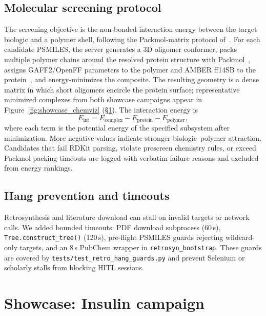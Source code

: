 \documentclass[twocolumn]{fairmeta}
\begin{document}
\subsection{Molecular screening protocol}
\label{sec:screening}

The screening objective is the non-bonded interaction energy between the target biologic and a polymer shell, following the Packmol-matrix protocol of~\cite{martins2026insulin}.
For each candidate PSMILES, the server generates a 3D oligomer conformer, packs multiple polymer chains around the resolved protein structure with Packmol~\cite{packmol2009}, assigns GAFF2/OpenFF parameters to the polymer and AMBER ff14SB to the protein~\cite{he2020amber,maier2015ff14sb,qiu2021development}, and energy-minimizes the composite.
The resulting geometry is a dense matrix in which short oligomers encircle the protein surface; representative minimized complexes from both showcase campaigns appear in Figure~\ref{fig:showcase_chemviz} (\S\ref{sec:insulin}).
The interaction energy is
\begin{equation}
E_\text{int} = E_\text{complex} - E_\text{protein} - E_\text{polymer},
\label{eq:eint}
\end{equation}
where each term is the potential energy of the specified subsystem after minimization.
More negative values indicate stronger biologic--polymer attraction.
Candidates that fail RDKit parsing, violate prescreen chemistry rules, or exceed Packmol packing timeouts are logged with verbatim failure reasons and excluded from energy rankings.

\subsection{Hang prevention and timeouts}

Retrosynthesis and literature download can stall on invalid targets or network calls.
We added bounded timeouts: PDF download subprocess (60\,s), \texttt{Tree.construct\_tree()} (120\,s), pre-flight PSMILES guards rejecting wildcard-only targets, and an 8\,s PubChem wrapper in \texttt{retrosyn\_bootstrap}.
These guards are covered by \texttt{tests/test\_retro\_hang\_guards.py} and prevent Selenium or scholarly stalls from blocking HITL sessions.

\section{Showcase: Insulin campaign}
\label{sec:insulin}
\end{document}
